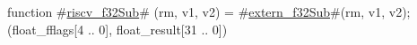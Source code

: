 function #\hyperref[sailRISCVzriscvzyf32Sub]{riscv\_f32Sub}# (rm, v1, v2) = {
  #\hyperref[sailRISCVzexternzyf32Sub]{extern\_f32Sub}#(rm, v1, v2);
  (float_fflags[4 .. 0], float_result[31 .. 0])
}
